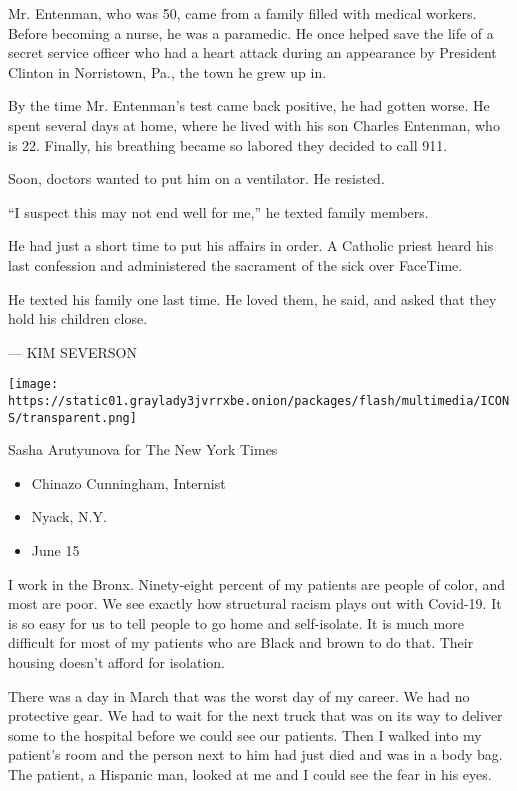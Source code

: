 Mr. Entenman, who was 50, came from a family filled with medical
workers. Before becoming a nurse, he was a paramedic. He once helped
save the life of a secret service officer who had a heart attack during
an appearance by President Clinton in Norristown, Pa., the town he grew
up in.

By the time Mr. Entenman's test came back positive, he had gotten worse.
He spent several days at home, where he lived with his son Charles
Entenman, who is 22. Finally, his breathing became so labored they
decided to call 911.

Soon, doctors wanted to put him on a ventilator. He resisted.

``I suspect this may not end well for me,'' he texted family members.

He had just a short time to put his affairs in order. A Catholic priest
heard his last confession and administered the sacrament of the sick
over FaceTime.

He texted his family one last time. He loved them, he said, and asked
that they hold his children close.

--- KIM SEVERSON

\texttt{[image: https://static01.graylady3jvrrxbe.onion/packages/flash/multimedia/ICONS/transparent.png]}

Sasha Arutyunova for The New York Times

\begin{itemize}
\tightlist
\item
  Chinazo Cunningham, Internist
\item
  Nyack, N.Y.
\item
  June 15
\end{itemize}

I work in the Bronx. Ninety-eight percent of my patients are people of
color, and most are poor. We see exactly how structural racism plays out
with Covid-19. It is so easy for us to tell people to go home and
self-isolate. It is much more difficult for most of my patients who are
Black and brown to do that. Their housing doesn't afford for isolation.

There was a day in March that was the worst day of my career. We had no
protective gear. We had to wait for the next truck that was on its way
to deliver some to the hospital before we could see our patients. Then I
walked into my patient's room and the person next to him had just died
and was in a body bag. The patient, a Hispanic man, looked at me and I
could see the fear in his eyes.

